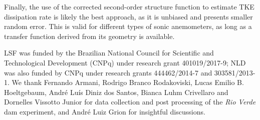\documentclass{svjour3}                     %
\begin{document}
Finally, the use of the corrected second-order structure function to
estimate TKE dissipation rate is likely the best approach, as it is
unbiased and presents smaller random error. This is valid for
different types of sonic anemometers, as long as a transfer function
derived from its geometry is available.

\begin{acknowledgements}
  LSF was funded by the Brazilian National Council for Scientific and
  Technological Development (CNPq) under research grant 401019/2017-9;
  NLD was also funded by CNPq under research grants 444462/2014-7 and
  303581/2013-1. We thank Fernando Armani, Rodrigo Branco Rodakoviski,
  Lucas Emilio B. Hoeltgebaum, Andr\'e Lu\'is Diniz dos Santos, Bianca
  Luhm Crivellaro and Dornelles Vissotto Junior for data collection
  and post processing of the \textit{Rio Verde} dam experiment, and
  Andr\'e Luiz Grion for insightful discussions.
\end{acknowledgements}

\end{document}
